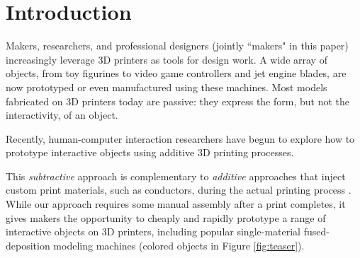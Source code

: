 
\section{Introduction}
Makers, researchers, and professional designers (jointly ``makers" in this paper) increasingly leverage 3D printers as tools for design work.  A wide array of objects, from toy figurines to video game controllers and jet engine blades, are now prototyped or even manufactured using these machines.  Most models fabricated on 3D printers today are passive: they express the form, but not the interactivity, of an object.  

Recently, human-computer interaction researchers have begun to explore how to prototype interactive objects using additive 3D printing processes.

  This {\em subtractive} approach is complementary to {\em additive} approaches that inject custom print materials, such as conductors, during the actual printing process \cite{Sells-reprap}. While our approach requires some manual assembly after a print completes, it gives makers the opportunity to cheaply and rapidly prototype a range of interactive objects on 3D printers, including popular single-material fused-deposition modeling machines (colored objects in Figure \ref{fig:teaser}).  

